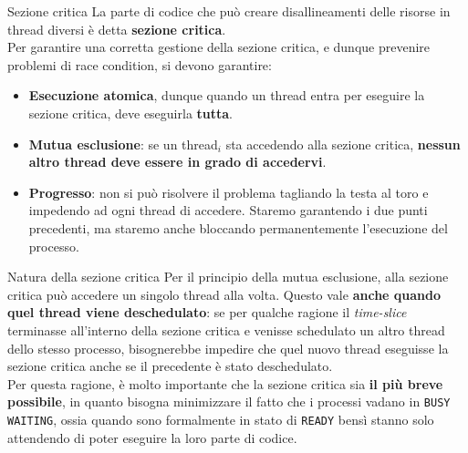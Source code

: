 \documentclass[12pt]{report}
\begin{document}
	\begin{definizione}{Sezione critica}{}
		La parte di codice che può creare disallineamenti delle risorse in thread diversi è detta \textbf{sezione critica}.\\
		Per garantire una corretta gestione della sezione critica, e dunque prevenire problemi di race condition, si devono garantire:
		\begin{itemize}
			\item \textbf{Esecuzione atomica}, dunque quando un thread entra per eseguire la sezione critica, deve eseguirla \textbf{tutta}.
			
			\item \textbf{Mutua esclusione}: se un thread$_i$ sta accedendo alla sezione critica, \textbf{nessun altro thread deve essere in grado di accedervi}.
			
			\item \textbf{Progresso}: non si può risolvere il problema tagliando la testa al toro e impedendo ad ogni thread di accedere. Staremo garantendo i due punti precedenti, ma staremo anche bloccando permanentemente l'esecuzione del processo.
		\end{itemize}
	\end{definizione}
	
	\begin{osservazione}{Natura della sezione critica}{}
		Per il principio della mutua esclusione, alla sezione critica può accedere un singolo thread alla volta. Questo vale \textbf{anche quando quel thread viene deschedulato}: se per qualche ragione il \textit{time-slice} terminasse all'interno della sezione critica e venisse schedulato un altro thread dello stesso processo, bisognerebbe impedire che quel nuovo thread eseguisse la sezione critica anche se il precedente è stato deschedulato.\\
		Per questa ragione, è molto importante che la sezione critica sia \textbf{il più breve possibile}, in quanto bisogna minimizzare il fatto che i processi vadano in \texttt{BUSY WAITING}, ossia quando sono formalmente in stato di \texttt{READY} bensì stanno solo attendendo di poter eseguire la loro parte di codice.
	\end{osservazione}
	
\end{document}
